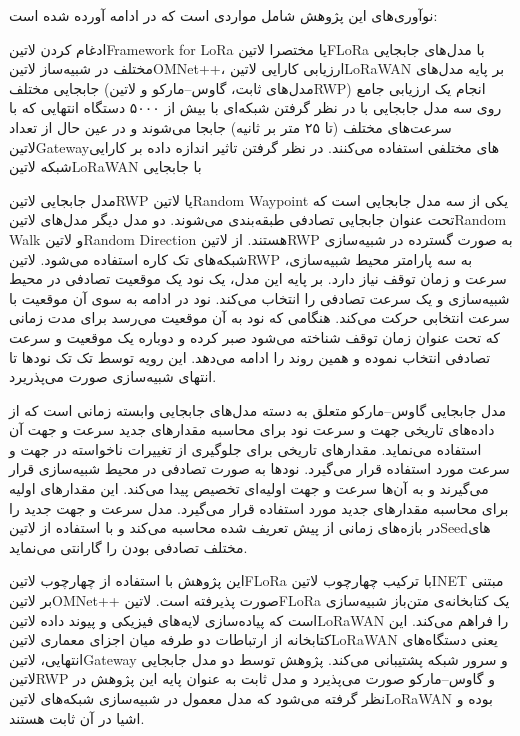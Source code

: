 نوآوری‌های این پژوهش شامل مواردی است که در ادامه آورده شده است:

 ادغام کردن ‌لاتین{Framework for LoRa} یا مختصرا ‌لاتین{FLoRa} با مدل‌های جابجایی مختلف در شبیه‌ساز ‌لاتین{OMNet++}،
 ارزیابی کارایی ‌لاتین{LoRaWAN} بر پایه مدل‌های جابجایی مختلف (مدل‌های ثابت، گاوس--مارکو و ‌لاتین{RWP})
 انجام یک ارزیابی جامع روی سه مدل جابجایی با در نظر گرفتن شبکه‌ای با بیش از ۵۰۰۰ دستگاه انتهایی که با سرعت‌های مختلف (تا ۲۵ متر بر ثانیه) جابجا می‌شوند و در عین حال از تعداد
‌لاتین{Gateway}های مختلفی استفاده می‌کنند.
 در نظر گرفتن تاثیر اندازه داده بر کارایی شبکه ‌لاتین{LoRaWAN} با جابجایی

مدل جابجایی ‌لاتین{RWP} یا ‌لاتین{Random Waypoint} یکی از سه مدل جابجایی است که تحت عنوان جابجایی تصادفی طبقه‌بندی می‌شوند.
دو مدل دیگر مدل‌های ‌لاتین{Random Walk} و ‌لاتین{Random Direction} هستند.
از ‌لاتین{RWP} به صورت گسترده در شبیه‌سازی شبکه‌های تک کاره استفاده می‌شود.
‌لاتین{RWP} به سه پارامتر محیط شبیه‌سازی، سرعت و زمان توقف نیاز دارد.
بر پایه این مدل، یک نود یک موقعیت تصادفی در محیط شبیه‌سازی و یک سرعت تصادفی را انتخاب می‌کند.
نود در ادامه به سوی آن موقعیت با سرعت انتخابی حرکت می‌کند. هنگامی که نود به آن موقعیت می‌رسد برای مدت زمانی که تحت عنوان زمان توقف
شناخته می‌شود صبر کرده و دوباره یک موقعیت و سرعت تصادفی انتخاب نموده و همین روند را ادامه می‌دهد. این رویه توسط تک تک نودها تا انتهای
شبیه‌سازی صورت می‌پذریرد.

مدل جابجایی گاوس--مارکو متعلق به دسته مدل‌های جابجایی وابسته زمانی است که از داده‌های تاریخی جهت و سرعت نود برای محاسبه
مقدارهای جدید سرعت و جهت آن استفاده می‌نماید. مقدارهای تاریخی برای جلوگیری از تغییرات ناخواسته در جهت و سرعت مورد استفاده قرار می‌گیرد.
نودها به صورت تصادفی در محیط شبیه‌سازی قرار می‌گیرند و به آن‌ها سرعت و جهت اولیه‌ای تخصیص پیدا می‌کند.
این مقدارهای اولیه برای محاسبه مقدارهای جدید مورد استفاده قرار می‌گیرد.
مدل سرعت و جهت جدید را در بازه‌های زمانی از پیش تعریف شده محاسبه می‌کند و با استفاده از ‌لاتین{Seed}های مختلف تصادفی بودن را گارانتی می‌نماید.

این پژوهش با استفاده از چهارچوب ‌لاتین{FLoRa} با ترکیب چهارچوب ‌لاتین{INET} مبتنی بر ‌لاتین{OMNet++} صورت پذیرفته است.
‌لاتین{FLoRa} یک کتابخانه‌ی متن‌باز شبیه‌سازی است که پیاده‌سازی لایه‌های فیزیکی و پیوند داده ‌لاتین{LoRaWAN} را فراهم می‌کند.
این کتابخانه از ارتباطات دو طرفه میان اجزای معماری ‌لاتین{LoRaWAN} یعنی دستگاه‌های انتهایی، ‌لاتین{Gateway} و سرور شبکه پشتیبانی می‌کند.
پژوهش توسط دو مدل جابجایی ‌لاتین{RWP} و گاوس--مارکو صورت می‌پذیرد و مدل ثابت به عنوان پایه این پژوهش در نظر گرفته می‌شود که مدل معمول
در شبیه‌سازی شبکه‌های ‌لاتین{LoRaWAN} بوده و اشیا در آن ثابت هستند.

